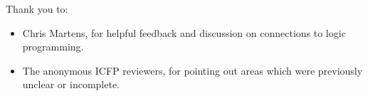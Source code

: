 \documentclass{sigplanconf}
\begin{document}


















\acks

Thank you to:
\begin{itemize}
\item Chris Martens, for helpful feedback and discussion on connections to logic
  programming.
\item The anonymous ICFP reviewers, for pointing out areas which were previously
  unclear or incomplete.
\end{itemize}





\end{document}

